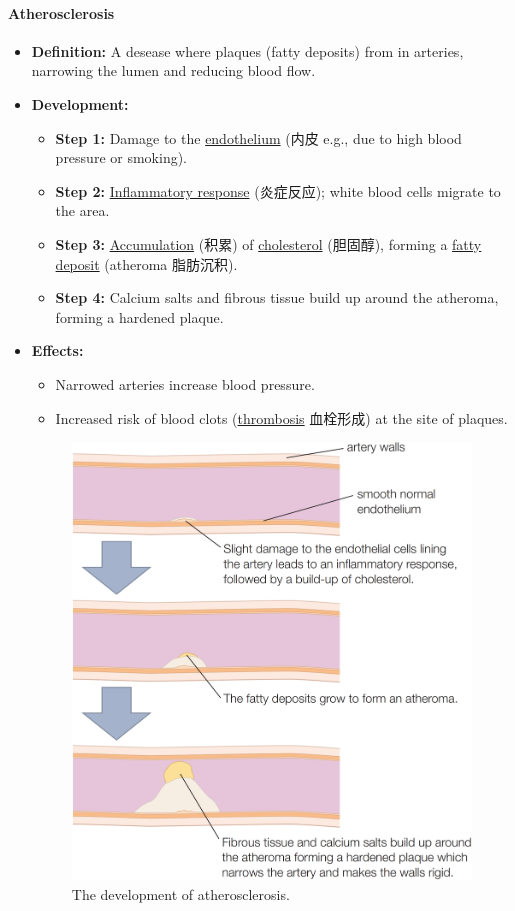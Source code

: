 \paragraph{Atherosclerosis}
\begin{itemize}
    \item \textbf{Definition:} A desease where plaques (fatty deposits) from in arteries, narrowing the lumen and reducing blood
    flow.
    \item \textbf{Development:}
    \begin{itemize}
        \item \textbf{Step 1:} Damage to the \underline{endothelium} (内皮 e.g., due to high blood pressure or smoking).
        \item \textbf{Step 2:} \underline{Inflammatory response} (炎症反应); white blood cells migrate to the area.
        \item \textbf{Step 3:} \underline{Accumulation} (积累) of \underline{cholesterol} (胆固醇), forming a \underline{fatty
        deposit} (atheroma 脂肪沉积).
        \item \textbf{Step 4:} Calcium salts and fibrous tissue build up around the atheroma, forming a hardened plaque.
    \end{itemize}
    \item \textbf{Effects:}
    \begin{itemize}
        \item Narrowed arteries increase blood pressure.
        \item Increased risk of blood clots (\underline{thrombosis} 血栓形成) at the site of plaques.
    \end{itemize}
    \begin{figure}[H]
        \centering
        \includegraphics[scale=0.18]{Biology/1B/Images/1B-5-1.png}
        \caption{The development of atherosclerosis.}
    \end{figure}
\end{itemize}

